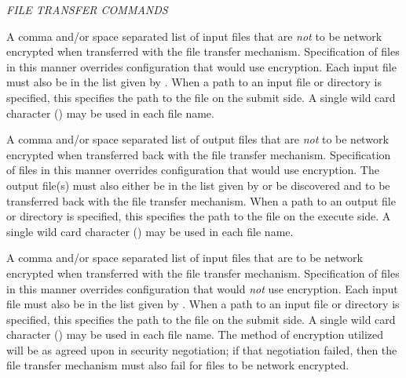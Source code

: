 \begin{description}
\end{description} 

\emph{FILE TRANSFER COMMANDS}
\begin{description} 


\label{man-condor-submit-dont-encrypt-input-files}
\item[dont\_encrypt\_input\_files = $<$ file1,file2,file... $>$] 
A comma and/or space separated list of input files that are \emph{not} to be
network encrypted when transferred with the file transfer mechanism.
Specification of files in this manner overrides configuration that would
use encryption.
Each input file must also be in the list given by
.
When a path to an input file or directory is specified, 
this specifies the path to the file on the submit side.
A single wild card character (\Expr{*}) may be used in each file name.


\label{man-condor-submit-dont-encrypt-output-files}
\item[dont\_encrypt\_output\_files = $<$ file1,file2,file... $>$] 
A comma and/or space separated list of output files that are \emph{not} to be
network encrypted when transferred back with the file transfer mechanism.
Specification of files in this manner overrides configuration that would
use encryption.
The output file(s) must also either be in the list given by
 or be discovered and to be transferred
back with the file transfer mechanism.
When a path to an output file or directory is specified, 
this specifies the path to the file on the execute side.
A single wild card character (\Expr{*}) may be used in each file name.


\label{man-condor-submit-encrypt-input-files}
\item[encrypt\_input\_files = $<$ file1,file2,file... $>$] 
A comma and/or space separated list of input files that are to be
network encrypted when transferred with the file transfer mechanism.
Specification of files in this manner overrides configuration that would
\emph{not} use encryption.
Each input file must also be in the list given by
.
When a path to an input file or directory is specified, 
this specifies the path to the file on the submit side.
A single wild card character (\Expr{*}) may be used in each file name.
The method of encryption utilized will be as agreed upon in security
negotiation; if that negotiation failed, then the file transfer
mechanism must also fail for files to be network encrypted.


\end{description}
